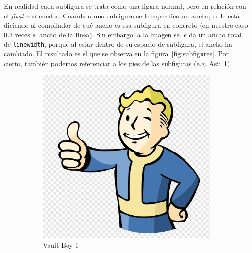 \documentclass[%
    school=etsisi,%
    type=pfg,%
    degree=61CI,%
]{upm-report}
\begin{document}
En realidad cada subfigura se trata como una figura normal, pero en relación con el \textit{float} contenedor. Cuando a una subfigura se le especifica un ancho, se le está diciendo al compilador de qué ancho es esa subfigura en concreto (en nuestro caso 0.3 veces el ancho de la línea). Sin embargo, a la imagen se le da un ancho total de \texttt{linewidth}, porque al estar dentro de su espacio de subfigura, el ancho ha cambiado. El resultado es el que se observa en la figura~\ref{fig:subfigures}. Por cierto, también podemos referenciar a los pies de las subfiguras (e.g. Así:~\ref{fig:subfigure-1}).

\begin{figure}
	\centering
	\begin{subfigure}{.3\textwidth}
		\includegraphics[width=\linewidth]{figures/vault-boy.png}
		\caption{\label{fig:subfigure-1}Vault Boy 1}
	\end{subfigure}
    \hfill
	\begin{subfigure}{.3\textwidth}

\end{subfigure}
\end{figure}
\end{document}
